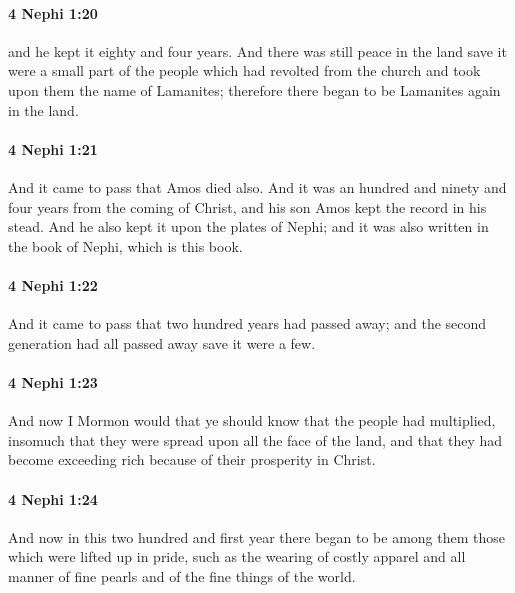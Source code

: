 		\paragraph{4 Nephi 1:20} %
			\label{4NEPHI-1-20}

			and he kept it eighty and four years.
			And there was still peace in the land
			save it were a small part of the people which had revolted from the church
			and took upon them the name of Lamanites;
			therefore there began to be Lamanites again in the land.

		\paragraph{4 Nephi 1:21} %
			\label{4NEPHI-1-21}

			And it came to pass that Amos died also.
			And it was an hundred and ninety and four years from the coming of Christ,
			and his son Amos kept the record in his stead.
			And he also kept it upon the plates of Nephi;
			and it was also written in the book of Nephi, which is this book.

		\paragraph{4 Nephi 1:22} %
			\label{4NEPHI-1-22}

			And it came to pass that two hundred years had passed away;
			and the second generation had all passed away save it were a few.

		\paragraph{4 Nephi 1:23} %
			\label{4NEPHI-1-23}

			And now I Mormon would that ye should know
			that the people had multiplied,
			insomuch that they were spread upon all the face of the land,
			and that they had become exceeding rich because of their prosperity in Christ.

		\paragraph{4 Nephi 1:24} %
			\label{4NEPHI-1-24}

			And now in this two hundred and first year
			there began to be among them those which were lifted up in pride,
			such as the wearing of costly apparel and all manner of fine pearls
			and of the fine things of the world.

